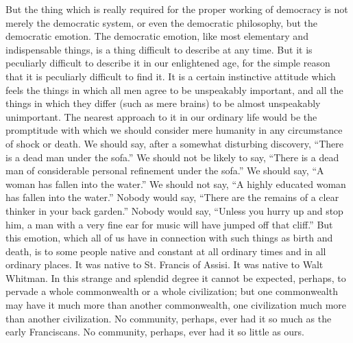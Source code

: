 But the thing which is really required for the proper working of democracy is not merely the democratic system, or even the democratic philosophy, but the democratic emotion. The democratic emotion, like most elementary and indispensable things, is a thing difficult to describe at any time. But it is peculiarly difficult to describe it in our enlightened age, for the simple reason that it is peculiarly difficult to find it. It is a certain instinctive attitude which feels the things in which all men agree to be unspeakably important, and all the things in which they differ (such as mere brains) to be almost unspeakably unimportant. The nearest approach to it in our ordinary life would be the promptitude with which we should consider mere humanity in any circumstance of shock or death. We should say, after a somewhat disturbing discovery, “There is a dead man under the sofa.” We should not be likely to say, “There is a dead man of considerable personal refinement under the sofa.” We should say, “A woman has fallen into the water.” We should not say, “A highly educated woman has fallen into the water.” Nobody would say, “There are the remains of a clear thinker in your back garden.” Nobody would say, “Unless you hurry up and stop him, a man with a very fine ear for music will have jumped off that cliff.” But this emotion, which all of us have in connection with such things as birth and death, is to some people native and constant at all ordinary times and in all ordinary places. It was native to St. Francis of Assisi. It was native to Walt Whitman. In this strange and splendid degree it cannot be expected, perhaps, to pervade a whole commonwealth or a whole civilization; but one commonwealth may have it much more than another commonwealth, one civilization much more than another civilization. No community, perhaps, ever had it so much as the early Franciscans. No community, perhaps, ever had it so little as ours.

